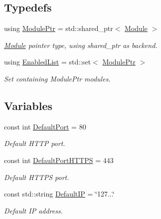 \subsection*{Typedefs}
\begin{DoxyCompactItemize}
\item 
using \hyperlink{namespace_zia_a26a1cd43d7216ed69ef26b99d8d12093}{Module\+Ptr} = std\+::shared\+\_\+ptr$<$ \hyperlink{class_zia_1_1_module}{Module} $>$
\begin{DoxyCompactList}\small\item\em \hyperlink{class_zia_1_1_module}{Module} pointer type, using shared\+\_\+ptr as backend. \end{DoxyCompactList}\item 
using \hyperlink{namespace_zia_a3076ef33a6c08b068cb8e444848ad33c}{Enabled\+List} = std\+::set$<$ \hyperlink{namespace_zia_a26a1cd43d7216ed69ef26b99d8d12093}{Module\+Ptr} $>$
\begin{DoxyCompactList}\small\item\em Set containing Module\+Ptr modules. \end{DoxyCompactList}\end{DoxyCompactItemize}
\subsection*{Variables}
\begin{DoxyCompactItemize}
\item 
const int \hyperlink{namespace_zia_a7b72c978ae2e795f74ce73291ebe3593}{Default\+Port} = 80
\begin{DoxyCompactList}\small\item\em Default H\+T\+TP port. \end{DoxyCompactList}\item 
const int \hyperlink{namespace_zia_ae53d6fd6614900bbc59b6912d6a629d4}{Default\+Port\+H\+T\+T\+PS} = 443
\begin{DoxyCompactList}\small\item\em Default H\+T\+T\+PS port. \end{DoxyCompactList}\item 
const std\+::string \hyperlink{namespace_zia_a40d4cbc794a3ff3df7017ff08173978f}{Default\+IP} = \char`\"{}127...\char`\"{}
\begin{DoxyCompactList}\small\item\em Default IP address. \end{DoxyCompactList}\end{DoxyCompactItemize}


